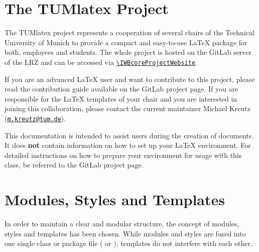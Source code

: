 \section{The TUMlatex Project}%
\label{sec:frontmatter_TUMlatex_project}%
The TUMlatex project represents a cooperation of several chairs of the Technical University of Munich to provide a compact and easy-to-use LaTeX package for both, employees and students. The whole project is hosted on the GitLab server of the LRZ and can be accessed via \texttt{\url{\IWBcoreProjectWebsite}}.\par%
%
If you are an advanced LaTeX user and want to contribute to this project, please read the contribution guide available on the GitLab project page. If you are responsible for the LaTeX templates of your chair and you are interested in joining this collaboration, please contact the current maintainer Michael Kreutz (\href{mailto:m.kreutz@tum.de}{\texttt{m.kreutz@tum.de}}).\par%
%
This documentation is intended to assist users during the creation of documents. It does \textbf{not} contain information on how to set up your LaTeX environment. For detailed instructions on how to prepare your environment for usage with this class, be referred to the GitLab project page.\par%
%
%
\section{Modules, Styles and Templates}%
\label{sec:frontmatter_modules_styles_templates}%
In order to maintain a clear and modular structure, the concept of modules, styles and templates has been chosen. While modules and styles are fused into one single class or package file ( or ), templates do not interfere with each other.\par%
%
